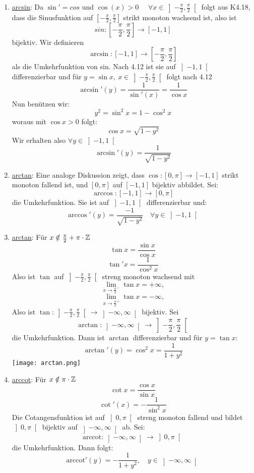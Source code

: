 \begin{enumerate}
    \item \underline{arcsin}: Da \(\sin' = cos\) und \( \cos(x) > 0 \quad\) \newline \(\forall x \in \left]-\frac{\pi}{2}, \frac{\pi}{2} \right[\) folgt aus K4.18, dass die Sinusfunktion auf \(\left[-\frac{\pi}{2}, \frac{\pi}{2}\right]\) strikt monoton wachsend ist, also ist
    \[ sin:\left[-\frac{\pi}{2}, \frac{\pi}{2}\right] \rightarrow \left[-1,1\right]\]
    bijektiv. Wir definieren
    \[\arcsin : \left[-1,1\right] \rightarrow \left[ -\frac{\pi}{2}, \frac{\pi}{2}\right]\]
    als die Umkehrfunktion von sin. Nach 4.12 ist sie auf \(\left]-1,1\right[\) differenzierbar und für \newline \( y = \sin x,\  x \in \left] -\frac{\pi}{2}, \frac{\pi}{2} \right[\) folgt nach 4.12
    \[\arcsin'(y) = \frac{1}{\sin'(x)} = \frac{1}{\cos x}\]
    Nun benützen wir:
    \[ y^2 = \sin^2x = 1 - \cos^2x\]
    woraus mit \( \cos x > 0 \) folgt:
    \[\cos x = \sqrt{1 - y^2}\]
    Wir erhalten also \( \forall y \in \left] -1,1 \right [\)
    \[ \arcsin'(y) = \frac{1}{\sqrt{1-y^2}}\]
    \item \underline{arctan}: Eine analoge Diskussion zeigt, dass \( \cos : \left[0,\pi\right] \rightarrow \left[-1,1\right]\) strikt monoton fallend ist, und \(\left[0,\pi\right]\) auf \( \left[-1,1\right]\) bijektiv abbildet. Sei:
    \[ \arccos : \left[-1,1\right] \rightarrow \left[0,\pi\right]\]
    die Umkehrfunktion. Sie ist auf \( \left] -1,1\right[\) differenzierbar und:
    \[ \arccos'(y) = \frac{-1}{\sqrt{1-y^2}} \quad \forall y \in \left]-1,1\right[\]
    \item \underline{arctan}: Für \( x \notin \frac{\pi}{2} + \pi \cdot \mathbb{Z} \)
    \[ \tan x = \frac{\sin x }{\cos x}\]
    \[ \tan' x = \frac{1}{\cos^2 x}\]
    Also ist \(\tan\) auf \( \left] -\frac{\pi}{2}, \frac{\pi}{2} \right[\) streng monoton wachsend mit
    \[ \lim_{x \rightarrow \frac{\pi}{2}^-} \tan x = +\infty,\]
    \[ \lim_{x \rightarrow \frac{\pi}{2}^+} \tan x = -\infty,\]
    Also ist \( \tan : \left]-\frac{\pi}{2}, \frac{\pi}{2} \right[ \rightarrow \left]-\infty, \infty \right[\) bijektiv. Sei
    \[ \arctan : \left] -\infty, \infty \right[ \rightarrow \left] -\frac{\pi}{2}, \frac{\pi}{2} \right[\]
    die Umkehrfunktion. Dann ist \(\arctan\) differenzierbar und für \( y = \tan x :\)
    \[ \arctan'(y) = \cos^2x = \frac{1}{1 + y^2}\]
    \hspace*{-8mm}\texttt{[image: arctan.png]}
    \item \underline{arccot}: Für \(x \notin \pi \cdot \mathbb{Z} \)
    \[ \cot x = \frac{\cos x }{\sin x}\]
    \[ \cot'(x) = -\frac{1}{\sin^2x} \]
    Die Cotangensfunktion ist auf \( \left] 0, \pi \right[\) streng monoton fallend und bildet \( \left] 0,\pi \right[\) bijektiv auf \( \left] -\infty,\infty\right[\) ab. Sei:
    \[ \text{arccot} : \left] -\infty, \infty \right[ \rightarrow \left] 0, \pi \right[\]
    die Umkehrfunktion. Dann folgt:
    \[ \text{arccot}'(y) = -\frac{1}{1+y^2}, \quad y \in \left] -\infty, \infty \right[\]
\end{enumerate}
